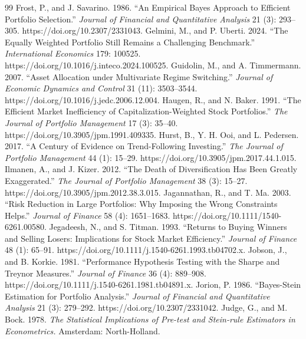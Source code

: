 \documentclass[12pt,letterpaper]{article}
\begin{document}
\begin{thebibliography}{99}
 Frost, P., and J. Savarino. 1986. ``An Empirical Bayes Approach to Efficient Portfolio Selection.'' \emph{Journal of Financial and Quantitative Analysis} 21 (3): 293–305. https://doi.org/10.2307/2331043.
 Gelmini, M., and P. Uberti. 2024. ``The Equally Weighted Portfolio Still Remains a Challenging Benchmark.'' \emph{International Economics} 179: 100525. https://doi.org/10.1016/j.inteco.2024.100525.
 Guidolin, M., and A. Timmermann. 2007. ``Asset Allocation under Multivariate Regime Switching.'' \emph{Journal of Economic Dynamics and Control} 31 (11): 3503–3544. https://doi.org/10.1016/j.jedc.2006.12.004.
 Haugen, R., and N. Baker. 1991. ``The Efficient Market Inefficiency of Capitalization-Weighted Stock Portfolios.'' \emph{The Journal of Portfolio Management} 17 (3): 35–40. https://doi.org/10.3905/jpm.1991.409335.
 Hurst, B., Y. H. Ooi, and L. Pedersen. 2017. ``A Century of Evidence on Trend-Following Investing.'' \emph{The Journal of Portfolio Management} 44 (1): 15–29. https://doi.org/10.3905/jpm.2017.44.1.015.
 Ilmanen, A., and J. Kizer. 2012. ``The Death of Diversification Has Been Greatly Exaggerated.'' \emph{The Journal of Portfolio Management} 38 (3): 15–27. https://doi.org/10.3905/jpm.2012.38.3.015.
 Jagannathan, R., and T. Ma. 2003. ``Risk Reduction in Large Portfolios: Why Imposing the Wrong Constraints Helps.'' \emph{Journal of Finance} 58 (4): 1651–1683. https://doi.org/10.1111/1540-6261.00580.
 Jegadeesh, N., and S. Titman. 1993. ``Returns to Buying Winners and Selling Losers: Implications for Stock Market Efficiency.'' \emph{Journal of Finance} 48 (1): 65–91. https://doi.org/10.1111/j.1540-6261.1993.tb04702.x.
 Jobson, J., and B. Korkie. 1981. ``Performance Hypothesis Testing with the Sharpe and Treynor Measures.'' \emph{Journal of Finance} 36 (4): 889–908. https://doi.org/10.1111/j.1540-6261.1981.tb04891.x.
 Jorion, P. 1986. ``Bayes-Stein Estimation for Portfolio Analysis.'' \emph{Journal of Financial and Quantitative Analysis} 21 (3): 279–292. https://doi.org/10.2307/2331042.
 Judge, G., and M. Bock. 1978. \emph{The Statistical Implications of Pre-test and Stein-rule Estimators in Econometrics.} Amsterdam: North-Holland.

\end{thebibliography}
\end{document}
